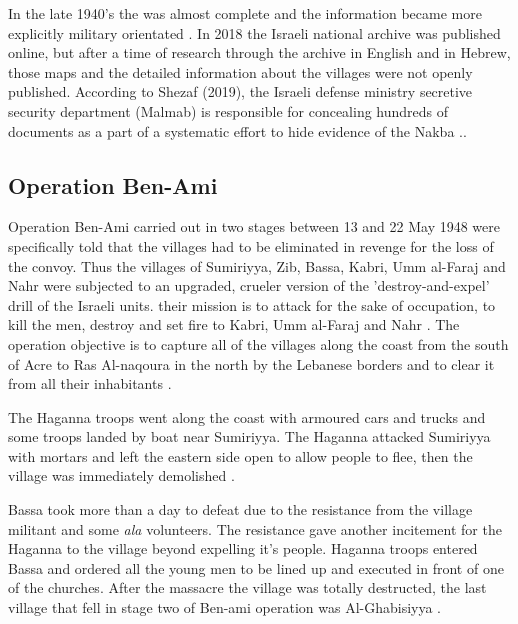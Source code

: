 In the late 1940's the  was almost complete and the information became more explicitly military orientated \citep{Pappe2006}. In 2018 the Israeli national archive was published online, but after a time of research through the archive in English and in Hebrew, those maps and the detailed information about the villages were not openly published. According to Shezaf (2019), the Israeli defense ministry secretive security department (Malmab) is responsible for concealing hundreds of documents as a part of a systematic effort to hide evidence of the Nakba \citep{Shezaf2019}.\citep{Shezaf2019}.


\subsection{Operation Ben-Ami}

Operation Ben-Ami carried out in two stages between 13 and 22 May 1948
were specifically told that the villages had to be eliminated in revenge for the
loss of the convoy. Thus the villages of Sumiriyya, Zib, Bassa, Kabri, Umm
al-Faraj and Nahr were subjected to an upgraded, crueler version of
the 'destroy-and-expel' drill of the Israeli units. their mission is to attack for
the sake of occupation, to kill the men, destroy and set fire to Kabri, Umm
al-Faraj and Nahr \citep{Pappe2006}. The operation objective is to capture all of the villages along the coast from the south of Acre to Ras Al-naqoura in the north by the Lebanese borders and to clear it from all their inhabitants \citep{Morris2004, Morris2008}.

The Haganna troops went along the coast with armoured cars and trucks and some troops landed by boat near Sumiriyya. The Haganna  attacked Sumiriyya with mortars and left the eastern side open to allow people to flee, then the village was immediately demolished \citep{Morris2004, Morris2008}.

Bassa took more than a day to defeat due to the resistance from the village militant and some \textit{\acrfull{ala}} volunteers. The resistance gave another incitement for the Haganna to  the village beyond expelling it's people. Haganna troops entered Bassa and ordered all the young men to be lined up and executed in front of one of the churches. After the massacre the village was totally destructed, the last village that fell in stage two of Ben-ami operation was Al-Ghabisiyya \citep{Morris2004, Pappe2006}.  



